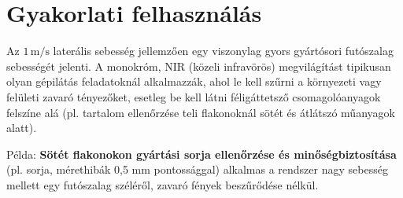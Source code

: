 

\section{Gyakorlati felhasználás}
Az $1 \, \text{m/s}$ laterális sebesség jellemzően egy viszonylag gyors gyártósori futószalag sebességét jelenti. A monokróm, NIR (közeli infravörös) megvilágítást tipikusan olyan gépilátás feladatoknál alkalmazzák, ahol le kell szűrni a környezeti vagy felületi zavaró tényezőket, esetleg be kell látni féligáttetsző csomagolóanyagok felszíne alá (pl. tartalom ellenőrzése teli flakonoknál sötét és átlátszó műanyagok alatt).

Példa: \textbf{Sötét flakonokon gyártási sorja ellenőrzése és minőségbiztosítása} (pl. sorja, mérethibák 0,5 mm pontossággal) alkalmas a rendszer nagy sebesség mellett egy futószalag széléről, zavaró fények beszűrődése nélkül.